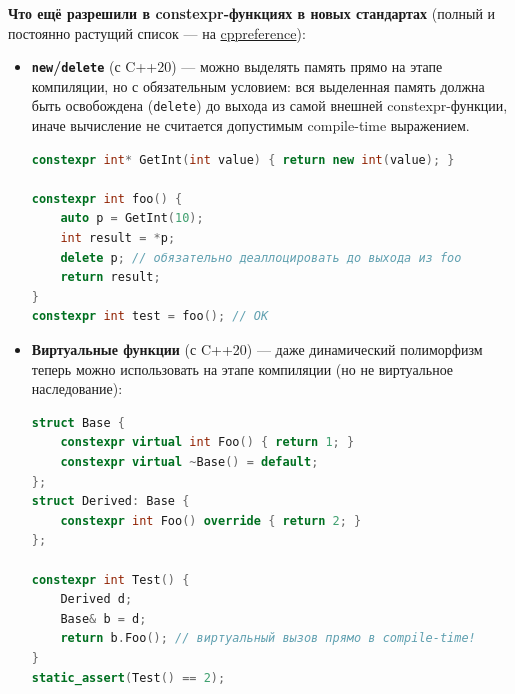 \textbf{Что ещё разрешили в constexpr-функциях в новых стандартах} (полный и постоянно растущий список --- на \href{https://en.cppreference.com/w/cpp/language/constexpr}{cppreference}):
\begin{itemize}
  \item \textbf{\texttt{new}/\texttt{delete}} (с C++20) --- можно выделять память прямо на этапе компиляции, но с обязательным условием: вся выделенная память должна быть освобождена (\texttt{delete}) до выхода из самой внешней constexpr-функции, иначе вычисление не считается допустимым compile-time выражением.
\begin{lstlisting}[language=C++]
constexpr int* GetInt(int value) { return new int(value); }

constexpr int foo() {
    auto p = GetInt(10);
    int result = *p;
    delete p; // обязательно деаллоцировать до выхода из foo
    return result;
}
constexpr int test = foo(); // OK
\end{lstlisting}
  \item \textbf{Виртуальные функции} (с C++20) --- даже динамический полиморфизм теперь можно использовать на этапе компиляции (но не виртуальное наследование):
\begin{lstlisting}[language=C++]
struct Base {
    constexpr virtual int Foo() { return 1; }
    constexpr virtual ~Base() = default;
};
struct Derived: Base {
    constexpr int Foo() override { return 2; }
};

constexpr int Test() {
    Derived d;
    Base& b = d;
    return b.Foo(); // виртуальный вызов прямо в compile-time!
}
static_assert(Test() == 2);
\end{lstlisting}
\end{itemize}
